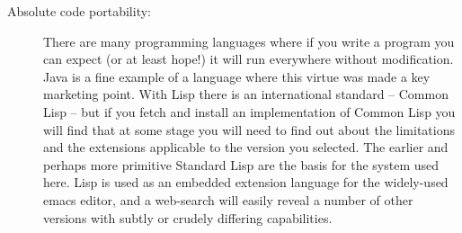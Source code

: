 \begin{description}
\item[Absolute code portability:] There are many programming languages
where if you write a program you can expect (or at least hope!) it will
run everywhere without modification. Java is a fine example of a language
where this virtue was made a key marketing point. With Lisp there is
an international standard -- Common Lisp\cite{ANSILisp} -- but if
you fetch and install an implementation of Common Lisp you will find that
at some stage you will need to find out about the limitations and the
extensions applicable to the version you selected. The earlier and
perhaps more primitive Standard Lisp\cite{StdLisp1}\cite{StdLisp2} are the
basis for the \vsl system used here. Lisp is used as an embedded extension
language for the widely-used {\tx emacs} editor, and a web-search will
easily reveal a number of other versions with subtly or crudely differing
capabilities.


\end{description}
